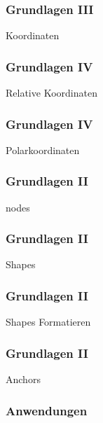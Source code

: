 \documentclass[14pt,ngerman]{beamer}
\begin{document}
\begin{frame}
\frametitle{Grundlagen III}

Koordinaten

\end{frame}



\begin{frame}
\frametitle{Grundlagen IV}

Relative Koordinaten


\end{frame}

\begin{frame}
\frametitle{Grundlagen IV}

Polarkoordinaten

\end{frame}

\begin{frame}
\frametitle{Grundlagen II}

nodes

\end{frame}


\begin{frame}
\frametitle{Grundlagen II}

Shapes

\end{frame}



\begin{frame}
\frametitle{Grundlagen II}

Shapes Formatieren

\end{frame}



\begin{frame}
\frametitle{Grundlagen II}

Anchors
\end{frame}

\begin{frame}
\frametitle{Anwendungen}


\end{frame}
\end{document}
